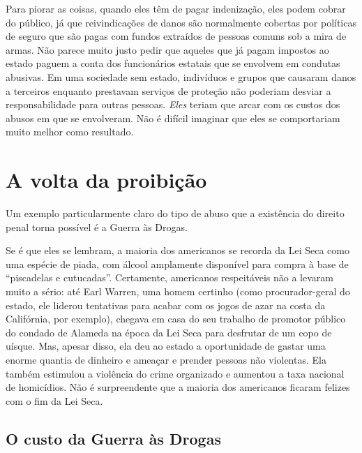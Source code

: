 Para piorar as coisas, quando eles têm de pagar indenização, eles podem cobrar do público, já que reivindicações de danos são normalmente cobertas por políticas de seguro que são pagas com fundos extraídos de pessoas comuns sob a mira de armas. Não parece muito justo pedir que aqueles que já pagam impostos ao estado paguem a conta dos funcionários estatais que se envolvem em condutas abusivas. Em uma sociedade sem estado, indivíduos e grupos que causaram danos a terceiros enquanto prestavam serviços de proteção não poderiam desviar a responsabilidade para outras pessoas. \emph{Eles} teriam que arcar com os custos dos abusos em que se envolveram. Não é difícil imaginar que eles se comportariam muito melhor como resultado.

\section{A volta da proibição}

Um exemplo particularmente claro do tipo de abuso que a existência do direito penal torna possível é a Guerra às Drogas.

Se é que eles se lembram, a maioria dos americanos se recorda da Lei Seca como uma espécie de piada, com álcool amplamente disponível para compra à base de ``piscadelas e cutucadas''. Certamente, americanos respeitáveis não a levaram muito a sério: até Earl Warren, uma homem certinho (como procurador-geral do estado, ele liderou tentativas para acabar com os jogos de azar na costa da Califórnia, por exemplo), chegava em casa do seu trabalho de promotor público do condado de Alameda na época da Lei Seca para desfrutar de um copo de uísque. Mas, apesar disso, ela deu ao estado a oportunidade de gastar uma enorme quantia de dinheiro e ameaçar e prender pessoas não violentas. Ela também estimulou a violência do crime organizado e aumentou a taxa nacional de homicídios. Não é surpreendente que a maioria dos americanos ficaram felizes com o fim da Lei Seca.

\subsection*{O custo da Guerra às Drogas}

